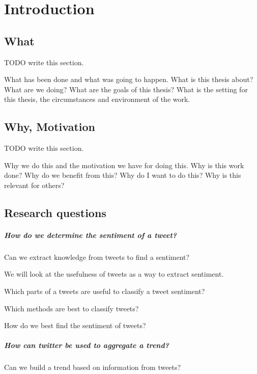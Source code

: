 \chapter{Introduction}

\section{What}
TODO write this section.

What has been done and what was going to happen.
What is this thesis about? What are we doing? What are the goals of this
thesis? What is the setting for this thesis, the circumstances and environment
of the work. 

\section{Why, Motivation}
TODO write this section.

Why we do this and the motivation we have for doing this.
Why is this work done? Why do we benefit from this? Why do I want to do this?
Why is this relevant for others? 

\section{Research questions}

\paragraph{How do we determine the sentiment of a tweet?\\}
Can we extract knowledge from tweets to find a sentiment?
	
We will look at the usefulness of tweets as a way to extract sentiment. 

Which parts of a tweets are useful to classify a tweet sentiment?

Which methods are best to classify tweets? 

How do we best find the sentiment of tweets?

\paragraph{How can twitter be used to aggregate a trend?\\}
Can we build a trend based on information from tweets? 
 
